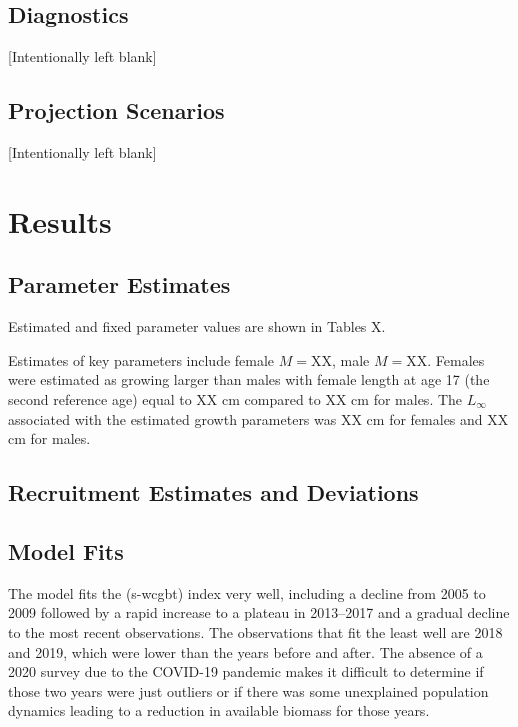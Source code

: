 \documentclass[
]{scrartcl}
\begin{document}
\subsection{Diagnostics}\label{sec-diagnostics}

{[}Intentionally left blank{]}

\subsection{Projection Scenarios}\label{projection-scenarios}

{[}Intentionally left blank{]}

\newpage{}

\section{Results}\label{results}

\subsection{Parameter Estimates}\label{parameter-estimates}

Estimated and fixed parameter values are shown in Tables X.

Estimates of key parameters include female \(M = \mathrm{XX}\), male \(M = \mathrm{XX}\).
Females were estimated as growing larger than males with female length
at age 17 (the second reference age) equal to XX cm compared to XX cm
for males. The \(L_\infty\) associated with the estimated growth
parameters was XX cm for females and XX cm for males.

\subsection{Recruitment Estimates and
Deviations}\label{recruitment-estimates-and-deviations}

\subsection{Model Fits}\label{model-fits}

The model fits the (\textsf{s-wcgbt}) index very well, including a decline from
2005 to 2009 followed by a rapid increase to a plateau in 2013--2017 and
a gradual decline to the most recent observations. The observations that
fit the least well are 2018 and 2019, which were lower than the years
before and after. The absence of a 2020 survey due to the COVID-19
pandemic makes it difficult to determine if those two years were just
outliers or if there was some unexplained population dynamics leading to
a reduction in available biomass for those years.
\end{document}

